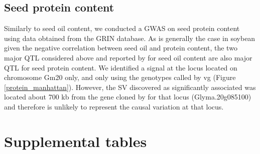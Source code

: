 \subsection*{Seed protein content}
\label{sv-gwas-seed-protein-content}

Similarly to seed oil content, we conducted a GWAS on seed protein content
using data obtained from the GRIN database. As is generally the case in
soybean given the negative correlation between seed oil and protein content,
the two major QTL considered above and reported by \cite{bandillo2015} for seed
oil content are also major QTL for seed protein content. We identified a signal
at the locus located on chromosome Gm20 only, and only using the genotypes
called by vg (Figure \ref{protein_manhattan}). However, the SV discovered as
significantly associated was located about 700 kb from the gene cloned by
\cite{fliege2022} for that locus (Glyma.20g085100) and therefore is unlikely to
represent the causal variation at that locus.

\clearpage

\section*{Supplemental tables}
\label{annexe-sv-gwas-tables}

\clearpage



